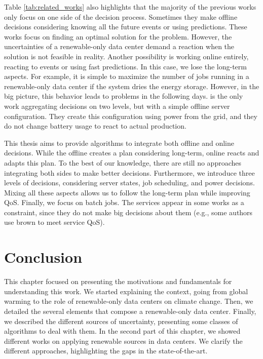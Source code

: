 Table \ref{tab:related_works} also highlights that the majority of the previous works only focus on one side of the decision process. Sometimes they make offline decisions considering knowing all the future events or using predictions. These works focus on finding an optimal solution for the problem. However, the uncertainties of a renewable-only data center demand a reaction when the solution is not feasible in reality. Another possibility is working online entirely, reacting to events or using fast predictions. In this case, we lose the long-term aspects. For example, it is simple to maximize the number of jobs running in a renewable-only data center if the system dries the energy storage. However, in the big picture, this behavior leads to problems in the following days. \cite{venkataswamy2023rare} is the only work aggregating decisions on two levels, but with a simple offline server configuration. They create this configuration using power from the grid, and they do not change battery usage to react to actual production.

This thesis aims to provide algorithms to integrate both offline and online decisions. While the offline creates a plan considering long-term, online reacts and adapts this plan. To the best of our knowledge, there are still no approaches integrating both sides to make better decisions. Furthermore, we introduce three levels of decisions, considering server states, job scheduling, and power decisions. Mixing all these aspects allows us to follow the long-term plan while improving QoS. Finally, we focus on batch jobs. The services appear in some works as a constraint, since they do not make big decisions about them (e.g., some authors use brown to meet service QoS).



\section{Conclusion}

This chapter focused on presenting the motivations and fundamentals for understanding this work. We started explaining the context, going from global warming to the role of renewable-only data centers on climate change. Then, we detailed the several elements that compose a renewable-only data center. Finally, we described the different sources of uncertainty, presenting some classes of algorithms to deal with them. In the second part of this chapter, we showed different works on applying renewable sources in data centers. We clarify the different approaches, highlighting the gaps in the state-of-the-art.